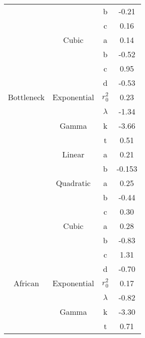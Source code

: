 \documentclass[11pt]{article}
\begin{document}
\begin{longtable}{c c c c}
           &             & b                          & -0.21         \\  
           &             & c                          & 0.16          \\  
           & Cubic       & a                          & 0.14          \\  
           &             & b                          & -0.52         \\  
           &             & c                          & 0.95          \\  
           &             & d                          & -0.53         \\  \hline
Bottleneck & Exponential & $r^2_0$ 					  & 0.23          \\  
           &             & $\lambda$                  & -1.34         \\  
           & Gamma       & k                          & -3.66         \\  
           &             & t                          & 0.51          \\  
           & Linear      & a                          & 0.21          \\  
           &             & b                          & -0.153        \\  
           & Quadratic   & a                          & 0.25          \\  
           &             & b                          & -0.44         \\  
           &             & c                          & 0.30          \\  
           & Cubic       & a                          & 0.28          \\  
           &             & b                          & -0.83         \\  
           &             & c                          & 1.31          \\  
           &             & d                          & -0.70         \\  \hline
African    & Exponential & $r^2_0$ 					  & 0.17          \\  
           &             & $\lambda$                  & -0.82         \\  
           & Gamma       & k                          & -3.30         \\  
           &             & t                          & 0.71          \\  

\end{longtable}
\end{document}
